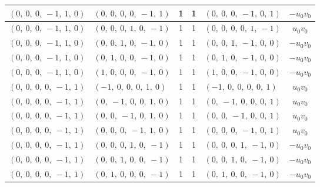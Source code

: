 \documentclass[11pt]{article}
\theoremstyle{definition}
\begin{document}
\begin{longtable}{|l|l|c|c|l|c|}
    \hline
    $\left( 0, \  0, \  0, \  -1, \  1, \  0\right)$ & $\left( 0, \  0, \  0, \  0, \  -1, \  1\right)$ & 1 & 1 & $\left( 0, \  0, \  0, \  -1, \  0, \  1\right)$ & $- u_{0} v_{0}$ \\
    \hline
    $\left( 0, \  0, \  0, \  -1, \  1, \  0\right)$ & $\left( 0, \  0, \  0, \  1, \  0, \  -1\right)$ & 1 & 1 & $\left( 0, \  0, \  0, \  0, \  1, \  -1\right)$ & $u_{0} v_{0}$ \\
    \hline
    $\left( 0, \  0, \  0, \  -1, \  1, \  0\right)$ & $\left( 0, \  0, \  1, \  0, \  -1, \  0\right)$ & 1 & 1 & $\left( 0, \  0, \  1, \  -1, \  0, \  0\right)$ & $- u_{0} v_{0}$ \\
    \hline
    $\left( 0, \  0, \  0, \  -1, \  1, \  0\right)$ & $\left( 0, \  1, \  0, \  0, \  -1, \  0\right)$ & 1 & 1 & $\left( 0, \  1, \  0, \  -1, \  0, \  0\right)$ & $- u_{0} v_{0}$ \\
    \hline
    $\left( 0, \  0, \  0, \  -1, \  1, \  0\right)$ & $\left( 1, \  0, \  0, \  0, \  -1, \  0\right)$ & 1 & 1 & $\left( 1, \  0, \  0, \  -1, \  0, \  0\right)$ & $- u_{0} v_{0}$ \\
    \hline
    $\left( 0, \  0, \  0, \  0, \  -1, \  1\right)$ & $\left( -1, \  0, \  0, \  0, \  1, \  0\right)$ & 1 & 1 & $\left( -1, \  0, \  0, \  0, \  0, \  1\right)$ & $u_{0} v_{0}$ \\
    \hline
    $\left( 0, \  0, \  0, \  0, \  -1, \  1\right)$ & $\left( 0, \  -1, \  0, \  0, \  1, \  0\right)$ & 1 & 1 & $\left( 0, \  -1, \  0, \  0, \  0, \  1\right)$ & $u_{0} v_{0}$ \\
    \hline
    $\left( 0, \  0, \  0, \  0, \  -1, \  1\right)$ & $\left( 0, \  0, \  -1, \  0, \  1, \  0\right)$ & 1 & 1 & $\left( 0, \  0, \  -1, \  0, \  0, \  1\right)$ & $u_{0} v_{0}$ \\
    \hline
    $\left( 0, \  0, \  0, \  0, \  -1, \  1\right)$ & $\left( 0, \  0, \  0, \  -1, \  1, \  0\right)$ & 1 & 1 & $\left( 0, \  0, \  0, \  -1, \  0, \  1\right)$ & $u_{0} v_{0}$ \\
    \hline
    $\left( 0, \  0, \  0, \  0, \  -1, \  1\right)$ & $\left( 0, \  0, \  0, \  1, \  0, \  -1\right)$ & 1 & 1 & $\left( 0, \  0, \  0, \  1, \  -1, \  0\right)$ & $- u_{0} v_{0}$ \\
    \hline
    $\left( 0, \  0, \  0, \  0, \  -1, \  1\right)$ & $\left( 0, \  0, \  1, \  0, \  0, \  -1\right)$ & 1 & 1 & $\left( 0, \  0, \  1, \  0, \  -1, \  0\right)$ & $- u_{0} v_{0}$ \\
    \hline
    $\left( 0, \  0, \  0, \  0, \  -1, \  1\right)$ & $\left( 0, \  1, \  0, \  0, \  0, \  -1\right)$ & 1 & 1 & $\left( 0, \  1, \  0, \  0, \  -1, \  0\right)$ & $- u_{0} v_{0}$ \\

\end{longtable}
\end{document}
